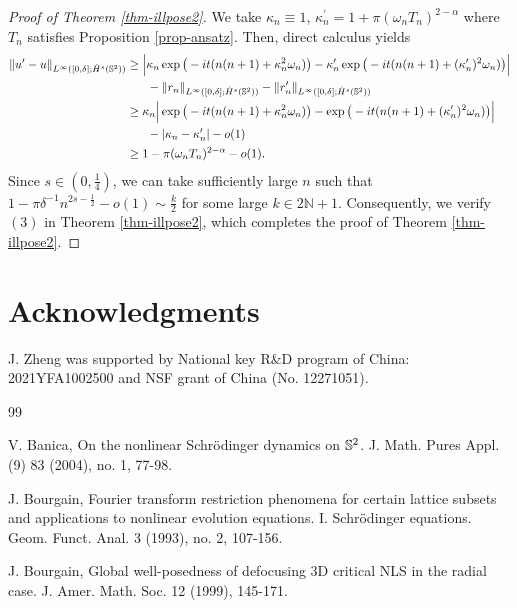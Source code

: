 \documentclass[11pt, reqno]{amsart}
\numberwithin{equation}{section}
\theoremstyle{definition}
\theoremstyle{remark}
\begin{document}
{\begin{proof}[Proof of Theorem \ref{thm-illpose2}]
We take $\kappa_n\equiv1$, $\kappa_n^\prime = 1+\pi (\omega_n T_n)^{2-\alpha}$ where $T_n$ satisfies Proposition \ref{prop-ansatz}. Then, direct calculus yields
\begin{equation*}
\begin{aligned}
\|u^\prime-u\|_{L^\infty([0,\delta];\dot{H}^s(\Bbb S^2))} &\ge \Big| \kappa_n\exp\big(-it(n(n+1)+\kappa_n^2\omega_n)\big)-\kappa^\prime_n\exp\big(-it(n(n+1)+(\kappa^\prime_n)^2\omega_n)\big) \Big|\\
&\hspace{4ex}- \|r_n\|_{L^\infty([0,\delta];\dot{H}^s(\Bbb S^2))}-\|r^\prime_n\|_{L^\infty([0,\delta];\dot{H}^s(\Bbb S^2))}\\
&\ge \kappa_n\Big| \exp\big(-it(n(n+1)+\kappa_n^2\omega_n)\big)-\exp\big(-it(n(n+1)+(\kappa^\prime_n)^2\omega_n)\big) \Big|\\
&\hspace{4ex}-|\kappa_n-\kappa_n^\prime|-o(1)\\
&\ge 1-\pi (\omega_n T_n)^{2-\alpha}-o(1).
\end{aligned}
\end{equation*}
Since $s\in (0,\frac{1}{4})$, we can take sufficiently large $n$ such that $1-\pi\delta^{-1}n^{2s-\frac{1}{2}}-o(1)\sim\frac{k}{2}$ for some large $k\in 2\mathbb{N}+1$. Consequently, we verify $(3)$ in Theorem \ref{thm-illpose2}, which completes the proof of Theorem \ref{thm-illpose2}.
\end{proof}
	
	
	
	
	
\section*{Acknowledgments}
 J. Zheng was supported by National key R\&D program of China: 2021YFA1002500 and  NSF grant of China (No. 12271051).



\begin{thebibliography}{99}

 V. Banica, On the nonlinear Schr\"{o}dinger dynamics on $\Bbb{S}^2$. J. Math. Pures Appl. (9) 83 (2004), no. 1, 77-98.
			
 J. Bourgain,  Fourier transform restriction phenomena for certain lattice subsets and applications to nonlinear evolution equations. I. Schr\"{o}dinger equations. Geom. Funct. Anal. 3 (1993), no. 2, 107-156.
			
 J. Bourgain, Global well-posedness of defocusing 3D critical NLS in the radial case. J. Amer. Math. Soc. 12 (1999), 145-171.
			

\end{thebibliography}}
\end{document}

